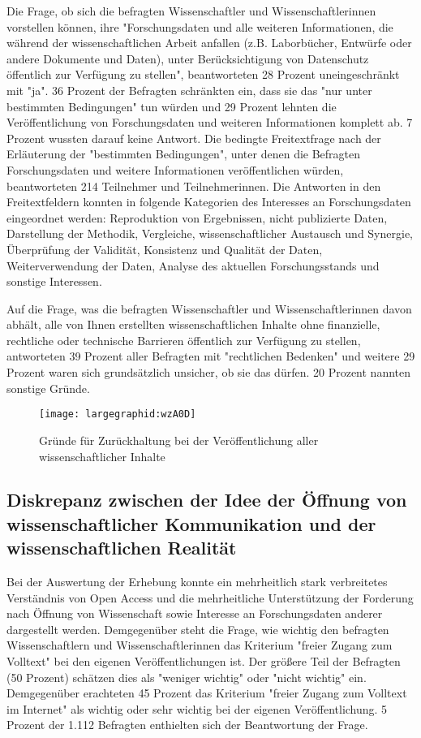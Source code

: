 Die Frage, ob sich die befragten Wissenschaftler und Wissenschaftlerinnen vorstellen können, ihre "Forschungsdaten und alle weiteren Informationen, die während der wissenschaftlichen Arbeit anfallen (z.B. Laborbücher, Entwürfe oder andere Dokumente und Daten), unter Berücksichtigung von Datenschutz öffentlich zur Verfügung zu stellen", beantworteten 28 Prozent uneingeschränkt mit "ja". 36 Prozent der Befragten schränkten ein, dass sie das "nur unter bestimmten Bedingungen" tun würden und 29 Prozent lehnten die Veröffentlichung von Forschungsdaten und weiteren Informationen komplett ab. 7 Prozent wussten darauf keine Antwort. Die bedingte Freitextfrage nach der Erläuterung der "bestimmten Bedingungen", unter denen die Befragten Forschungsdaten und weitere Informationen veröffentlichen würden, beantworteten 214 Teilnehmer und Teilnehmerinnen. Die Antworten in den Freitextfeldern konnten in folgende Kategorien des Interesses an Forschungsdaten eingeordnet werden: Reproduktion von Ergebnissen, nicht publizierte Daten, Darstellung der Methodik, Vergleiche, wissenschaftlicher Austausch und Synergie, Überprüfung der Validität, Konsistenz und Qualität der Daten, Weiterverwendung der Daten, Analyse des aktuellen Forschungsstands und sonstige Interessen.

Auf die Frage, was die befragten Wissenschaftler und Wissenschaftlerinnen davon abhält, alle von Ihnen erstellten wissenschaftlichen Inhalte ohne finanzielle, rechtliche oder technische Barrieren öffentlich zur Verfügung zu stellen, antworteten 39 Prozent aller Befragten mit "rechtlichen Bedenken" und weitere 29 Prozent waren sich grundsätzlich unsicher, ob sie das dürfen. 20 Prozent nannten sonstige Gründe.

\begin{figure}[h!]
\texttt{[image: largegraphid:wzA0D]}
\caption{Gründe für Zurückhaltung bei der Veröffentlichung aller wissenschaftlicher Inhalte}
\end{figure}

\subsection{Diskrepanz zwischen der Idee der Öffnung von wissenschaftlicher Kommunikation und der wissenschaftlichen Realität}

Bei der Auswertung der Erhebung konnte ein mehrheitlich stark verbreitetes Verständnis von Open Access und die mehrheitliche Unterstützung der Forderung nach Öffnung von Wissenschaft sowie Interesse an Forschungsdaten anderer dargestellt werden. Demgegenüber steht die Frage, wie wichtig den befragten Wissenschaftlern und Wissenschaftlerinnen das Kriterium "freier Zugang zum Volltext" bei den eigenen Veröffentlichungen ist. Der größere Teil der Befragten (50 Prozent) schätzen dies als "weniger wichtig" oder "nicht wichtig" ein. Demgegenüber erachteten 45 Prozent das Kriterium "freier Zugang zum Volltext im Internet" als wichtig oder sehr wichtig bei der eigenen Veröffentlichung. 5 Prozent der 1.112 Befragten enthielten sich der Beantwortung der Frage.

